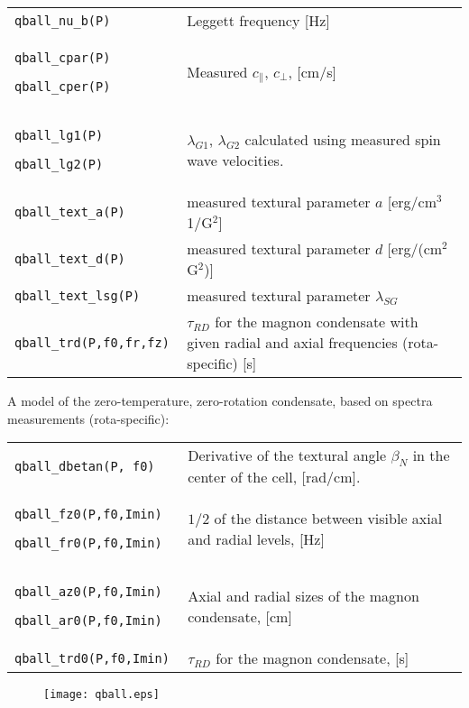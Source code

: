 \documentclass[a4paper]{article}
\begin{document}
\medskip
\noindent\begin{tabular}{p{4cm}p{11cm}}
\tt qball\_nu\_b(P) & Leggett frequency [Hz]\\
\tt qball\_cpar(P)\par
\tt qball\_cper(P)  & Measured $c_\parallel$, $c_\perp$, [cm/s]\\
\tt qball\_lg1(P)\par
\tt qball\_lg2(P)    & $\lambda_{G1}$, $\lambda_{G2}$ calculated
                      using measured spin wave velocities.\\
\tt qball\_text\_a(P)      &  measured textural parameter $a$ [erg/cm$^3$ 1/G$^2$]\\
\tt qball\_text\_d(P)      &  measured textural parameter $d$ [erg/(cm$^2$ G$^2$)]\\
\tt qball\_text\_lsg(P)    &  measured textural parameter $\lambda_{SG}$\\

\tt qball\_trd(P,f0,fr,fz) & $\tau_{RD}$ for the magnon condensate with given radial and axial frequencies (rota-specific) [s]\\
\end{tabular}

A model of the zero-temperature, zero-rotation condensate, based on spectra measurements (rota-specific):

\medskip
\noindent\begin{tabular}{p{4cm}p{11cm}}
\tt qball\_dbetan(P, f0)  & Derivative of the textural angle $\beta_N$ in the center of the cell, [rad/cm].\\
\tt qball\_fz0(P,f0,Imin)\par
\tt qball\_fr0(P,f0,Imin)  & $1/2$ of the distance between visible axial and radial levels, [Hz]\\
\tt qball\_az0(P,f0,Imin)\par
\tt qball\_ar0(P,f0,Imin)  & Axial and radial sizes of the magnon condensate, [cm]\\
\tt qball\_trd0(P,f0,Imin) & $\tau_{RD}$ for the magnon condensate, [s]\\
\end{tabular}

\begin{figure}[h]
\texttt{[image: qball.eps]}\\
\end{figure}


\end{document}
